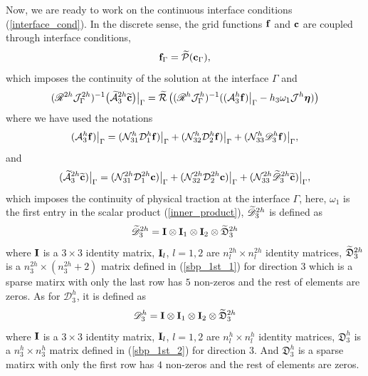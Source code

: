 Now, we are ready to  work on the continuous interface conditions (\ref{interface_cond}). In the discrete sense,  the grid functions ${\bf f}$ and ${\bf c}$ are coupled through interface conditions,
\begin{equation}\label{continuous_sol}
{\bf f}_{\Gamma} = \wt{\mathcal{P}}({\bf c}_{\Gamma}),
\end{equation}
which imposes the continuity of the solution at the interface $\Gamma$
and
\begin{equation}\label{continuous_traction}
(\mathscr{R}^{2h}{\mathcal J}_{\Gamma}^{2h})^{-1}\big(\wt{\mathcal{A}}_3^{2h}\wt{\bf c}\big)\big|_\Gamma
= \wt{\mathcal{R}}\left((\mathscr{R}^{h}{\mathcal J}^h_{\Gamma})^{-1}((\mathcal{A}_3^h{\bf f})\big|_\Gamma-h_3\omega_1{\mathcal J}^h{\bm \eta})\right)
\end{equation}
where we have used the notations
\begin{equation}\label{hatAf}
(\mathcal{A}_3^h{\bf f})\big|_\Gamma = (\mathcal{N}_{31}^{h}\mathcal{D}^h_1{\bf f})\big|_\Gamma + (\mathcal{N}_{32}^h\mathcal{D}^h_2{\bf f})\big|_\Gamma + (\mathcal{N}_{33}^h\mathscr{D}_3^h{\bf f})\big|_\Gamma,
\end{equation}
and
\begin{equation}\label{hatAc}
(\wt{\mathcal{A}}_3^{2h}\wt{\bf c})\big|_\Gamma = (\mathcal{N}_{31}^{2h}\mathcal{D}^{2h}_1{\bf c})\big|_\Gamma + (\mathcal{N}_{32}^{2h}\mathcal{D}^{2h}_2{\bf c})\big|_\Gamma + (\mathcal{N}_{33}^{2h}\wt{\mathscr D}^{2h}_3\wt{\bf c})\big|_\Gamma,
\end{equation}
which imposes the continuity of physical traction at the interface $\Gamma$, here, $\omega_1$ is the first entry in the scalar product (\ref{inner_product}), $\widetilde{\mathscr{D}}_3^{2h}$ is defined as
\[\widetilde{\mathscr{D}}_3^{2h} = {\bf I}\otimes {\bf I}_1 \otimes {\bf I}_2 \otimes \widetilde{\mathfrak{D}}_3^{2h}\]
where ${\bf I}$ is a $3\times3$ identity matrix, ${\bf I}_l$, $l = 1,2$ are $n_l^{2h}\times n_l^{2h}$ identity matrices, $\widetilde{\mathfrak{D}}_3^{2h}$ is a $n_3^{2h}\times (n_3^{2h}+2)$ matrix defined in (\ref{sbp_1st_1}) for direction $3$ which is a sparse matirx with only the last row has $5$ non-zeros and the rest of elements are zeros. As for $\mathscr{D}_3^{h}$, it is defined as
\[\mathscr{D}_3^{h} = {\bf I}\otimes {\bf I}_1 \otimes {\bf I}_2 \otimes \widetilde{\mathfrak{D}}_3^{2h}\]
where ${\bf I}$ is a $3\times3$ identity matrix, ${\bf I}_l$, $l = 1,2$ are $n_l^{h}\times n_l^{h}$ identity matrices, $\mathfrak{D}_3^{h}$ is a $n_3^{h}\times n_3^{h}$ matrix defined in (\ref{sbp_1st_2}) for direction $3$. And $\mathfrak{D}_3^{h}$ is a sparse matirx with only the first row has $4$ non-zeros and the rest of elements are zeros. 


